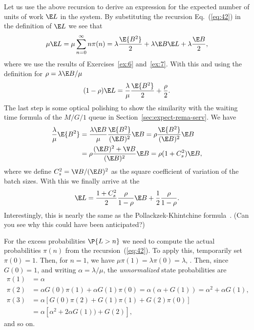 Let us use the above recursion to derive an expression for the
expected number of units of work $\E L$ in the system. By substituting
the recursion Eq.~(\ref{eq:42}) in the definition of $\E L$ we see
that
\begin{equation}\label{eq:67}
  \mu \E L =\mu \sum_{n=0}^\infty n \pi(n) = \lambda \frac{\E{B^2}}2  + \lambda \E B \E L +\lambda \frac{\E B}2,
\end{equation}
where we use the results of Exercises~\ref{ex:6} and~\ref{ex:7}. With this and using the definition for $\rho=\lambda \E B/\mu$
\begin{equation*}
(1- \rho) \E L = \frac{\lambda}\mu \frac{\E{B^2}}2 + \frac\rho2.
\end{equation*}
The last step is some optical polishing to show the similarity with
the waiting time formula of the $M/G/1$ queue in
Section~\ref{sec:expect-rema-serv}. We have
\begin{equation*}
  \begin{split}
  \frac{\lambda}\mu \E{B^2} 
&=   \frac{\lambda\E B}{\mu} \frac{\E{B^2}}{(\E B)^2} \E B  = \rho \frac{\E{B^2}}{(\E B)^2} \E B \\
&= \rho \frac{(\E B)^2+\V B}{(\E B)^2}\E B = \rho (1+C_s^2)\E B, 
  \end{split}
\end{equation*}
where we define $C_s^2 = \V B/(\E B)^2$ as the square coefficient of
variation of the batch sizes.  With this we finally arrive at the
\begin{equation}\label{eq:43}
\E L = \frac{1+C_s^2}2 \frac{\rho}{1-\rho} \E B + \frac12\frac\rho{1-\rho}.
\end{equation}
Interestingly, this is nearly the same as the Pollackzek-Khintchine
formula~\label{eq:70}. (Can you see why this could have been
anticipated?)

For the excess probabilities $\P{L>n}$ we need to compute the actual
probabilities $\pi(n)$ from the recursion~(\ref{eq:42}). To apply
this, temporarily set $\pi(0)=1$. Then, for $n=1$, we have
$\mu \pi(1) = \lambda \pi(0)=\lambda$, . Then,
since $G(0)=1$, and writing $\alpha = \lambda/\mu$, the
\emph{unnormalized} state probabilities are
\begin{equation*}
  \begin{split}
  \pi(1) &= \alpha \\
  \pi(2) &= \alpha G(0) \pi(1) + \alpha G(1) \pi(0) =\alpha(\alpha+ G(1)) = \alpha^2 + \alpha G(1), \\
  \pi(3) 
&= \alpha[G(0) \pi(2) + G(1) \pi(1) + G(2) \pi(0)]  \\
&= \alpha[ \alpha^2 + 2 \alpha G(1)) + G(2)],
  \end{split}
\end{equation*}
 and so on.  

